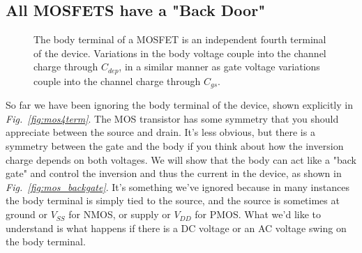 \subsection{All MOSFETS have a "Back Door"}
\begin{figure}[b]
\centering
{}
\caption{The body terminal of a MOSFET is an independent fourth terminal of the device.  Variations in the body voltage couple into the channel charge through $C_{dep}$, in a similar manner as gate voltage variations couple into the channel charge through $C_{gs}$.} 
\end{figure}
So far we have been ignoring the body terminal of the device, shown explicitly in \emph{Fig.~\ref{fig:mos4term}}.  The MOS transistor has some symmetry that you should appreciate between the source and drain.  It's less obvious, but there is a symmetry between the gate and the body if you think about how the inversion charge depends on both voltages. We will show that the body can act like a "back gate" and control the inversion and thus the current in the device, as shown in \emph{Fig.~\ref{fig:mos_backgate}}.  It's something we've ignored because in many instances the body terminal is simply tied to the source, and the source is sometimes at ground or $V_{SS}$ for NMOS, or supply or $V_{DD}$ for PMOS.  What we'd like to understand is what happens if there is a DC voltage or an AC voltage swing on the body terminal.
